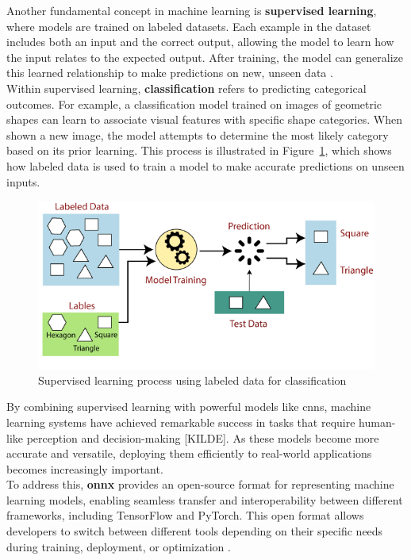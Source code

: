Another fundamental concept in machine learning is \textbf{supervised learning}, where models are trained on labeled datasets. Each example in the dataset includes both an input and the correct output, allowing the model to learn how the input relates to the expected output. After training, the model can generalize this learned relationship to make predictions on new, unseen data \cite{geeksforgeeks:supervised-learning, google:supervised-learning}. \\

Within supervised learning, \textbf{classification} refers to predicting categorical outcomes. For example, a classification model trained on images of geometric shapes can learn to associate visual features with specific shape categories. When shown a new image, the model attempts to determine the most likely category based on its prior learning. This process is illustrated in Figure~\ref{fig:supervised-learning}, which shows how labeled data is used to train a model to make accurate predictions on unseen inputs. \\

\newpage

\begin{figure}[h!] \centering \includegraphics[width=0.75\linewidth]{figures/theory/machine-learning/supervised-learning.png} \caption[Supervised learning with labeled data]{Supervised learning process using labeled data for classification \cite{tpointtech:supervised-learning}} \label{fig:supervised-learning} \end{figure}

By combining supervised learning with powerful models like \glspl{cnn}, machine learning systems have achieved remarkable success in tasks that require human-like perception and decision-making [KILDE]. As these models become more accurate and versatile, deploying them efficiently to real-world applications becomes increasingly important.  \\

To address this, \textbf{\gls{onnx}} provides an open-source format for representing machine learning models, enabling seamless transfer and interoperability between different frameworks, including TensorFlow and PyTorch. This open format allows developers to switch between different tools depending on their specific needs during training, deployment, or optimization \cite{roboflow:onnx}.\\

